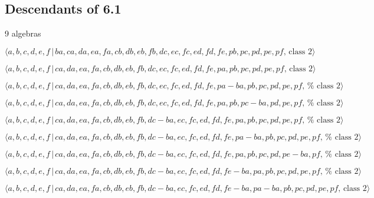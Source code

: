 \documentclass[10pt]{article}
\begin{document}
\subsection{Descendants of 6.1}

9 algebras

\begin{equation}
\langle
a,b,c,d,e,f\,|\,ba,ca,da,ea,fa,cb,db,eb,fb,dc,ec,fc,ed,fd,fe,pb,pc,pd,pe,pf,%
\,\text{class }2\rangle  \tag{7.4764}
\end{equation}

\begin{equation}
\langle
a,b,c,d,e,f\,|\,ca,da,ea,fa,cb,db,eb,fb,dc,ec,fc,ed,fd,fe,pa,pb,pc,pd,pe,pf,%
\,\text{class }2\rangle  \tag{7.4765}
\end{equation}

\begin{equation}
\langle
a,b,c,d,e,f\,|%
\,ca,da,ea,fa,cb,db,eb,fb,dc,ec,fc,ed,fd,fe,pa-ba,pb,pc,pd,pe,pf,\,\text{%
class }2\rangle  \tag{7.4766}
\end{equation}

\begin{equation}
\langle
a,b,c,d,e,f\,|%
\,ca,da,ea,fa,cb,db,eb,fb,dc,ec,fc,ed,fd,fe,pa,pb,pc-ba,pd,pe,pf,\,\text{%
class }2\rangle  \tag{7.4767}
\end{equation}

\begin{equation}
\langle
a,b,c,d,e,f\,|%
\,ca,da,ea,fa,cb,db,eb,fb,dc-ba,ec,fc,ed,fd,fe,pa,pb,pc,pd,pe,pf,\,\text{%
class }2\rangle  \tag{7.4768}
\end{equation}

\begin{equation}
\langle
a,b,c,d,e,f\,|%
\,ca,da,ea,fa,cb,db,eb,fb,dc-ba,ec,fc,ed,fd,fe,pa-ba,pb,pc,pd,pe,pf,\,\text{%
class }2\rangle  \tag{7.4769}
\end{equation}

\begin{equation}
\langle
a,b,c,d,e,f\,|%
\,ca,da,ea,fa,cb,db,eb,fb,dc-ba,ec,fc,ed,fd,fe,pa,pb,pc,pd,pe-ba,pf,\,\text{%
class }2\rangle  \tag{7.4770}
\end{equation}

\begin{equation}
\langle
a,b,c,d,e,f\,|%
\,ca,da,ea,fa,cb,db,eb,fb,dc-ba,ec,fc,ed,fd,fe-ba,pa,pb,pc,pd,pe,pf,\,\text{%
class }2\rangle  \tag{7.4771}
\end{equation}

\begin{equation}
\langle
a,b,c,d,e,f\,|%
\,ca,da,ea,fa,cb,db,eb,fb,dc-ba,ec,fc,ed,fd,fe-ba,pa-ba,pb,pc,pd,pe,pf,\,%
\text{class }2\rangle  \tag{7.4772}
\end{equation}



\end{document}
